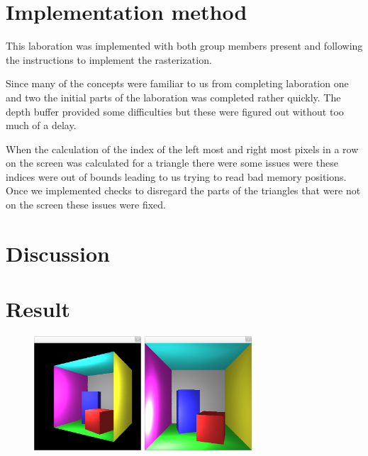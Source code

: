 \documentclass{article}
\begin{document}
\section{Implementation method}

This laboration was implemented with both group members present and following
the instructions to implement the rasterization.

Since many of the concepts were familiar to us from completing laboration one
and two the initial parts of the laboration was completed rather quickly. The
depth buffer provided some difficulties but these were figured out without too
much of a delay.

When the calculation of the index of the left most and right most pixels in a
row on the screen was calculated for a triangle there were some issues were 
these indices were out of bounds leading to us trying to read bad memory
positions. Once we implemented checks to disregard the parts of the triangles 
that were not on the screen these issues were fixed.
\section{Discussion}
\section{Result}
\begin{figure}[H]
    \centering
    \begin{minipage}{.5\textwidth}
        \centering
        \includegraphics[width=4cm]{ani0.png}
    \end{minipage}%
    \begin{minipage}{.5\textwidth}
        \centering
        \includegraphics[width=4cm]{light0.png}
    \end{minipage}
\end{figure}
\end{document}
